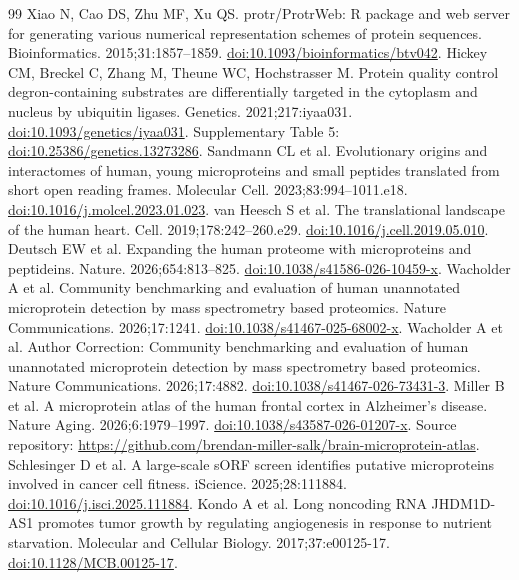 \documentclass[11pt,a4paper]{article}
\begin{document}
\begin{thebibliography}{99}
 Xiao N, Cao DS, Zhu MF, Xu QS. protr/ProtrWeb: R package and web server for generating various numerical representation schemes of protein sequences. Bioinformatics. 2015;31:1857--1859. \href{https://doi.org/10.1093/bioinformatics/btv042}{doi:10.1093/bioinformatics/btv042}.
 Hickey CM, Breckel C, Zhang M, Theune WC, Hochstrasser M. Protein quality control degron-containing substrates are differentially targeted in the cytoplasm and nucleus by ubiquitin ligases. Genetics. 2021;217:iyaa031. \href{https://doi.org/10.1093/genetics/iyaa031}{doi:10.1093/genetics/iyaa031}. Supplementary Table 5: \href{https://doi.org/10.25386/genetics.13273286}{doi:10.25386/genetics.13273286}.
 Sandmann CL et al. Evolutionary origins and interactomes of human, young microproteins and small peptides translated from short open reading frames. Molecular Cell. 2023;83:994--1011.e18. \href{https://doi.org/10.1016/j.molcel.2023.01.023}{doi:10.1016/j.molcel.2023.01.023}.
 van Heesch S et al. The translational landscape of the human heart. Cell. 2019;178:242--260.e29. \href{https://doi.org/10.1016/j.cell.2019.05.010}{doi:10.1016/j.cell.2019.05.010}.
 Deutsch EW et al. Expanding the human proteome with microproteins and peptideins. Nature. 2026;654:813--825. \href{https://doi.org/10.1038/s41586-026-10459-x}{doi:10.1038/s41586-026-10459-x}.
 Wacholder A et al. Community benchmarking and evaluation of human unannotated microprotein detection by mass spectrometry based proteomics. Nature Communications. 2026;17:1241. \href{https://doi.org/10.1038/s41467-025-68002-x}{doi:10.1038/s41467-025-68002-x}.
 Wacholder A et al. Author Correction: Community benchmarking and evaluation of human unannotated microprotein detection by mass spectrometry based proteomics. Nature Communications. 2026;17:4882. \href{https://doi.org/10.1038/s41467-026-73431-3}{doi:10.1038/s41467-026-73431-3}.
 Miller B et al. A microprotein atlas of the human frontal cortex in Alzheimer's disease. Nature Aging. 2026;6:1979--1997. \href{https://doi.org/10.1038/s43587-026-01207-x}{doi:10.1038/s43587-026-01207-x}. Source repository: \url{https://github.com/brendan-miller-salk/brain-microprotein-atlas}.
 Schlesinger D et al. A large-scale sORF screen identifies putative microproteins involved in cancer cell fitness. iScience. 2025;28:111884. \href{https://doi.org/10.1016/j.isci.2025.111884}{doi:10.1016/j.isci.2025.111884}.
 Kondo A et al. Long noncoding RNA JHDM1D-AS1 promotes tumor growth by regulating angiogenesis in response to nutrient starvation. Molecular and Cellular Biology. 2017;37:e00125-17. \href{https://doi.org/10.1128/MCB.00125-17}{doi:10.1128/MCB.00125-17}.

\end{thebibliography}
\end{document}
